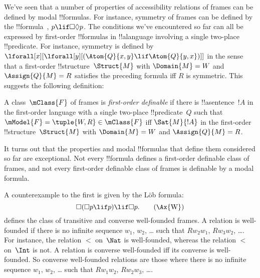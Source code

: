 \documentclass[../../../include/open-logic-section]{subfiles}
\begin{document}


We've seen that a number of properties of accessibility relations of
frames can be defined by modal !!{formula}s. For instance, symmetry of
frames can be defined by the !!{formula}~, $p \lif \Box\Diamond
p$. The conditions we've encountered so far can all be expressed by
first-order !!{formula}s in !!a{language} involving a single two-place
!!{predicate}. For instance, symmetry is defined by
$\lforall[x][\lforall[y][(\Atom{Q}{x,y} \lif \Atom{Q}{y, x})]]$ in the
sense that a first-order !!{structure}~$\Struct{M}$ with $\Domain{M} =
W$ and $\Assign{Q}{M} = R$ satisfies the preceding formula iff $R$ is
symmetric. This suggests the following definition:

\begin{defn}
  A class~$\mClass{F}$ of frames is \emph{first-order definable} if there is
  !!a{sentence}~$!A$ in the first-order language with a single
  two-place !!{predicate}~$Q$ such that $\mModel{F} =
  \tuple{W, R} \in \mClass{F}$ iff $\Sat{M}{!A}$ in the first-order
  !!{structure}~$\Struct{M}$ with $\Domain{M} = W$ and $\Assign{Q}{M}
  = R$.
\end{defn}

It turns out that the properties and modal !!{formula}s that define
them considered so far are exceptional. Not every !!{formula} defines
a first-order definable class of frames, and not every first-order
definable class of frames is definable by a modal formula.

A counterexample to the first is given by the L\"ob formula:
\begin{equation}
\Box(\Box p \lif p) \lif \Box p. \tag{\Ax{W}}
\end{equation}
 defines the class of transitive and converse well-founded
frames. A relation is well-founded if there is no infinite sequence
$w_1$, $w_2$, \dots{} such that $Rw_2w_1$, $Rw_3w_2$, \dots. For
instance, the relation $<$ on~$\Nat$ is well-founded, whereas the
relation $<$ on~$\Int$ is not. A relation is converse well-founded
iff its converse is well-founded. So converse well-founded relations
are those where there is no infinite sequence $w_1$, $w_2$, \dots{}
such that $Rw_1w_2$, $Rw_2w_3$, \dots. 
\end{document}
